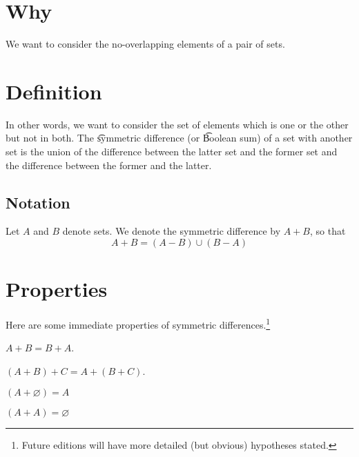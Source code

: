 

\section*{Why}

We want to consider the no-overlapping elements of a pair of sets.

\section*{Definition}

In other words, we want to consider the set of elements which is one or the other but not in both.
The \t{symmetric difference} (or \t{Boolean sum}) of a set with another set is the union of the difference between the latter set and the former set and the difference between the former and the latter.

\subsection*{Notation}

Let $A$ and $B$ denote sets.
We denote the symmetric difference by $A + B$, so that
    \[
A + B = (A - B) \cup (B - A)
    \]

\section*{Properties}

Here are some immediate properties of symmetric differences.\footnote{Future editions will have more detailed (but obvious) hypotheses stated.}

\begin{proposition}[Commutative]
$A + B = B + A$.\end{proposition}
\begin{proposition}[Associative]
$(A + B) + C = A + (B + C)$.\end{proposition}
\begin{proposition}[Identity]
$(A + \varnothing) = A$\end{proposition}
\begin{proposition}[Inverse]
$(A + A) = \varnothing$\end{proposition}
\blankpage